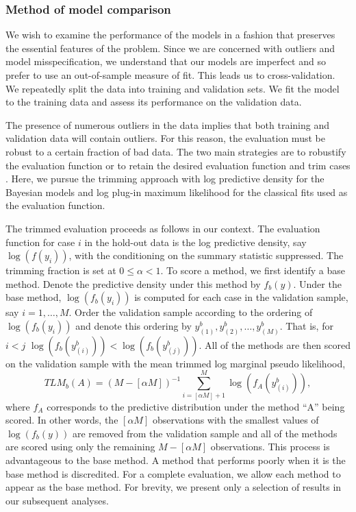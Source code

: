 \documentclass[12pt]{article}
\begin{document}
\subsubsection{Method of model comparison}
We wish to examine the performance of the models in a fashion that preserves the essential features of the 
problem.  Since we are concerned with outliers and model 
misspecification, we understand that our models are imperfect and so prefer to use an out-of-sample measure of fit.  
This leads us to cross-validation.  We repeatedly split the data into training
and validation sets.  We fit the model to the training data and assess its performance on the validation data.  

The presence of numerous outliers in the data implies that both training and validation data will contain 
outliers.  For this reason, the evaluation must be robust to a certain fraction of bad data.  
The two main strategies are to robustify the evaluation function \citep[e.g.,][]{ronchetti1997} or 
to retain the desired evaluation function and trim cases \citep{jung2014}.  Here,
we pursue the trimming approach with log predictive density for the Bayesian models and log plug-in 
maximum likelihood for the classical fits used as the evaluation function.

The trimmed evaluation proceeds as follows in our context.  The evaluation function for case $i$ in the hold-out data
is the log predictive density, say
$\log(f(y_i))$, with the conditioning on the 
summary statistic suppressed.  The trimming 
fraction is set at $0 \leq \alpha < 1$. To score a method,
we first identify a base method. Denote the predictive density under this method by $f_{b}(y)$.  Under the base method, $\log(f_{b}(y_i))$ is computed for each case in the 
validation sample, say $i = 1, \ldots, M$.  Order the validation
sample according to the ordering of $\log(f_{b}(y_i))$ and denote this
ordering by $y_{(1)}^b, y_{(2)}^b, \dots, y_{(M)}^b$. That is, for $i<j$
$\log(f_{b}(y_{(i)}^b))<\log(f_{b}(y_{(j)}^b))$. All of the methods are then scored on the validation sample with the mean trimmed log marginal pseudo likelihood, 
\[TLM_b(A) = (M - [\alpha M])^{-1} \sum_{i=[\alpha M]+1}^{M}
    \log(f_A(y_{(i)}^b)),\]
 where $f_A$ corresponds to the predictive
 distribution under the method ``A'' being scored.  In other words, the $[\alpha M]$ observations with the smallest values of $\log(f_{b}(y))$ are 
removed from the validation sample and all of the methods are scored using only the
remaining $M - [\alpha M]$ observations. This process is advantageous to the base method.  A method
that performs poorly when it is the base method is discredited.  For a complete evaluation, we allow each method
to appear as the base method.  For brevity, we present only a selection of results in our subsequent analyses.  
\end{document}

